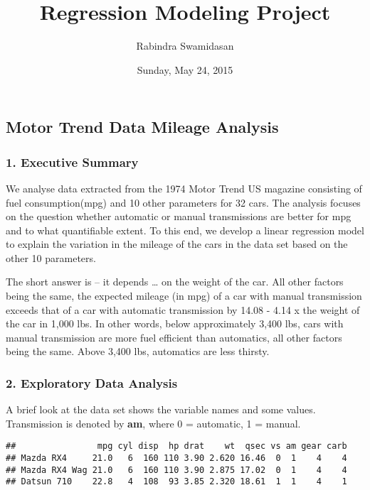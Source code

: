 \documentclass[10pt,]{article}
\title{Regression Modeling Project}
\author{Rabindra Swamidasan}
\date{Sunday, May 24, 2015}
\begin{document}
\maketitle


\subsection{Motor Trend Data Mileage
Analysis}\label{motor-trend-data-mileage-analysis}

\subsubsection{1. Executive Summary}\label{executive-summary}

We analyse data extracted from the 1974 Motor Trend US magazine
consisting of fuel consumption(mpg) and 10 other parameters for 32 cars.
The analysis focuses on the question whether automatic or manual
transmissions are better for mpg and to what quantifiable extent. To
this end, we develop a linear regression model to explain the variation
in the mileage of the cars in the data set based on the other 10
parameters.

The short answer is -- it depends \ldots{} on the weight of the car. All
other factors being the same, the expected mileage (in mpg) of a car
with manual transmission exceeds that of a car with automatic
transmission by 14.08 - 4.14 x the weight of the car in 1,000 lbs. In
other words, below approximately 3,400 lbs, cars with manual
transmission are more fuel efficient than automatics, all other factors
being the same. Above 3,400 lbs, automatics are less thirsty.

\subsubsection{2. Exploratory Data
Analysis}\label{exploratory-data-analysis}

A brief look at the data set shows the variable names and some values.
Transmission is denoted by \textbf{am}, where 0 = automatic, 1 = manual.

\begin{verbatim}
##                mpg cyl disp  hp drat    wt  qsec vs am gear carb
## Mazda RX4     21.0   6  160 110 3.90 2.620 16.46  0  1    4    4
## Mazda RX4 Wag 21.0   6  160 110 3.90 2.875 17.02  0  1    4    4
## Datsun 710    22.8   4  108  93 3.85 2.320 18.61  1  1    4    1
\end{verbatim}
\end{document}
